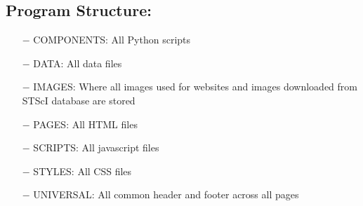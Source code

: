 \documentclass[12pt,letterpaper]{article}
\begin{document}
\subsection*{Program Structure:}
\begin{enumerate}
  \item [$-$] COMPONENTS: All Python scripts
  \item [$-$] DATA: All data files
  \item [$-$] IMAGES: Where all images used for websites and images downloaded from STScI database are stored
  \item [$-$] PAGES: All HTML files
  \item [$-$] SCRIPTS: All javascript files
  \item [$-$] STYLES: All CSS files
  \item [$-$] UNIVERSAL: All common header and footer across all pages
\end{enumerate}
\end{document}
